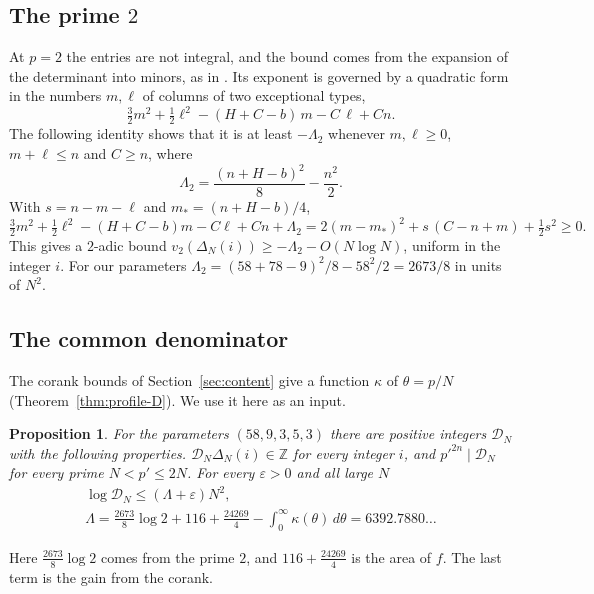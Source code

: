 \documentclass[11pt]{amsart}
\newcommand{\LamDen}{6392.7880}
\newtheorem{proposition}[theorem]{Proposition}
\theoremstyle{definition}
\theoremstyle{remark}
\numberwithin{equation}{section}
\newcommand{\Z}{\mathbb Z}
\newcommand{\cD}{\mathcal D}
\begin{document}
\subsection{The prime $2$}
At $p=2$ the entries are not integral, and the bound comes from the expansion of the determinant into
minors, as in \cite[\S3]{OpenAI2026}. Its exponent is governed by a quadratic form in the numbers $m,\ell$
of columns of two exceptional types,
\[
 \tfrac32m^2+\tfrac12\ell^2-(H+C-b)\,m-C\,\ell+Cn .
\]
The following identity shows that it is at least $-\Lambda_2$ whenever $m,\ell\ge0$, $m+\ell\le n$ and
$C\ge n$, where
\begin{equation}\label{eq:A2}
 \Lambda_2=\frac{(n+H-b)^2}8-\frac{n^2}2 .
\end{equation}
With $s=n-m-\ell$ and $m_*=(n+H-b)/4$,
\[
 \tfrac32m^2+\tfrac12\ell^2-(H+C-b)m-C\ell+Cn+\Lambda_2
 =2(m-m_*)^2+s\,(C-n+m)+\tfrac12s^2\ge0 .
\]
This gives a $2$-adic bound $v_2(\Delta_N(i))\ge-\Lambda_2-O(N\log N)$, uniform in the integer $i$. For our
parameters $\Lambda_2=(58+78-9)^2/8-58^2/2=2673/8$ in units of $N^2$.

\subsection{The common denominator}
The corank bounds of Section~\ref{sec:content} give a function $\kappa$ of $\theta=p/N$
(Theorem~\ref{thm:profile-D}). We use it here as an input.

\begin{proposition}\label{prop:denominators}
For the parameters $(58,9,3,5,3)$ there are positive integers $\cD_N$ with the following properties.
$\cD_N\Delta_N(i)\in\Z$ for every integer $i$, and $p'^{2n}\mid\cD_N$ for every prime $N<p'\le2N$. For every
$\varepsilon>0$ and all large $N$
\begin{gather*}
 \log\cD_N\le(\Lambda+\varepsilon)N^2,\\
 \Lambda=\frac{2673}8\log2+116+\frac{24269}4-\int_0^\infty\kappa(\theta)\,d\theta=\LamDen\ldots
\end{gather*}
\end{proposition}

Here $\frac{2673}8\log2$ comes from the prime $2$, and $116+\frac{24269}4$ is the area of $f$. The last term
is the gain from the corank.
\end{document}

